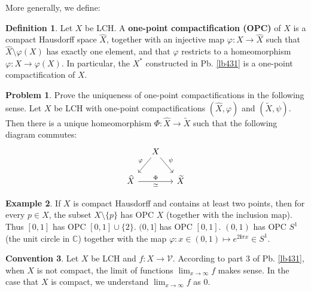 \documentclass[12pt,b5paper,notitlepage]{article}
\theoremstyle{definition}
\newtheorem{df}{Definition}[section]
\newtheorem{eg}[df]{Example}
\newtheorem{cv}[df]{Convention}
\newtheorem{prob}{\color{red}Problem}[section]
\theoremstyle{plain}
\newcommand{\mc}{\mathcal}
\newcommand{\wtd}{\widetilde}
\newcommand{\wht}{\widehat}
\newcommand{\im}{\mathbf{i}}
\newcommand{\Cbb}{\mathbb C}
\numberwithin{equation}{section}
\begin{document}
More generally, we define:
\begin{df}
Let $X$ be LCH. A \textbf{one-point compactification (OPC)} of  $X$ is a compact Hausdorff space $\wht X$, together with an injective map $\varphi:X\rightarrow \wht X$ such that $\wht X\setminus \varphi(X)$ has exactly one element,  and that $\varphi$ restricts to a homeomorphism $\varphi:X\rightarrow\varphi(X)$. In particular, the $X^*$ constructed in Pb. \ref{lb431} is a one-point compactification of $X$.
\end{df}



\begin{prob}
Prove the uniqueness of one-point compactifications in the following sense. Let $X$ be LCH with one-point compactifications $(\wht X,\varphi)$ and $(\wtd X,\psi)$. Then there is a unique homeomorphism $\Phi:\wht X\rightarrow\wtd X$ such that the following diagram commutes:
\begin{equation}
\begin{tikzcd}[column sep=small]
                     & X \arrow[ld,"\varphi"'] \arrow[rd,"\psi"] &   \\
\wht X \arrow[rr, "\Phi","\simeq"'] &                         & \wtd X
\end{tikzcd}
\end{equation}
\end{prob}

\begin{eg}\label{lb433}
If $X$ is compact Hausdorff and contains at least two points, then for every $p\in X$, the subset $X\setminus\{p\}$ has OPC $X$ (together with the inclusion map). Thus $[0,1]$ has OPC $[0,1]\cup\{2\}$. $(0,1]$ has OPC $[0,1]$. $(0,1)$ has OPC $S^1$ (the unit circle in $\Cbb$) together with the map $\varphi:x\in(0,1)\mapsto e^{2\im\pi x}\in S^1$.
\end{eg}



\begin{cv}
Let $X$ be LCH and $f:X\rightarrow \mc V$. According to part 3 of Pb. \ref{lb431}, when $X$ is not compact, the limit of functions $\lim_{x\rightarrow\infty}f$ makes sense. In the case that $X$ is compact, we understand  $\lim_{x\rightarrow\infty}f$ as $0$.
\end{cv}
\end{document}
